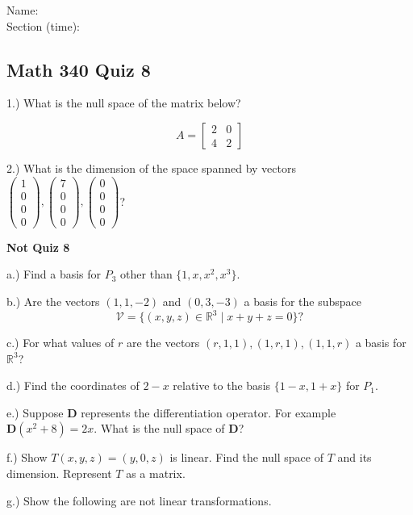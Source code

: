 \documentclass{article}
\begin{document}
Name:\\
\medskip
Section (time):

\subsection*{Math 340 Quiz 8}

1.) What is the null space of the matrix below?

$$ A= \left[ \begin{array}{cc}
2 & 0\\
4 & 2
\end{array}\right]$$

\bigskip


2.) What is the dimension of the space spanned by vectors $ \left(\begin{array}{c}
1\\
0 \\
0 \\
0 \end{array}\right), \left(\begin{array}{c}
7 \\
0 \\
0 \\
0 \end{array}\right), \left(\begin{array}{c}
0 \\
0 \\
0 \\
0 \end{array}\right)$?

\pagebreak

\textbf{Not Quiz 8}


a.) Find a basis for $P_3$ other than $\{1, x, x^2, x^3\}.$


b.) Are the vectors $(1,1,-2)$ and $(0,3,-3)$ a basis for the subspace $$\mathcal{V}=\{(x,y,z)\in\mathbb{R}^3 \mid x+y+z=0\}?$$


c.) For what values of $r$ are the vectors $(r,1,1),(1,r,1),(1,1,r)$ a basis for $\mathbb{R}^3$?

d.) Find the coordinates of $2-x$ relative to the basis $\{1-x,1+x\}$ for $P_1$. 


e.) Suppose $\mathbf{D}$ represents the differentiation operator. For example $\mathbf{D}(x^2+8)=2x$. What is the null space of $\mathbf{D}$?

f.) Show $T(x,y,z)=(y,0,z)$ is linear. Find the null space of $T$ and its dimension. Represent $T$ as a matrix. 


g.) Show the following are not linear transformations. 
\end{document}
